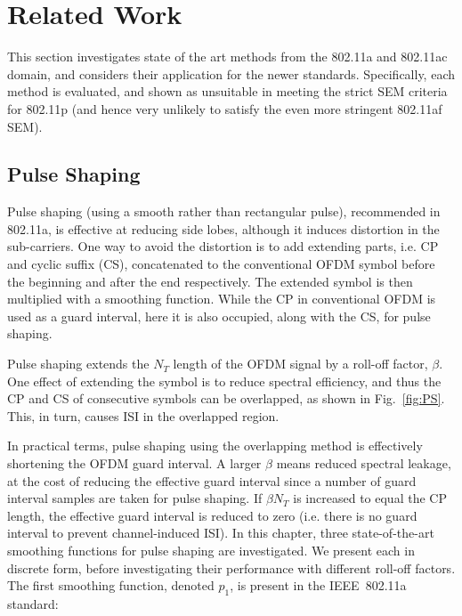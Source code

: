 \section{Related Work}

This section investigates state of the art methods from the 802.11a and 802.11ac domain, and considers their application for the newer standards.
Specifically, each method is evaluated, and shown as unsuitable in meeting the strict SEM criteria for 802.11p (and hence very unlikely to satisfy the even more stringent 802.11af SEM).

\subsection{Pulse Shaping}
\label{subsec:Pulse}
Pulse shaping (using a smooth rather than rectangular pulse), recommended in 802.11a, is effective at reducing side lobes, although it induces distortion in the sub-carriers.
One way to avoid the distortion is to add extending parts, i.e. CP and cyclic suffix (CS), concatenated to the conventional OFDM symbol before the beginning and after the end respectively. The extended symbol is then multiplied with a smoothing function.
While the CP in conventional OFDM is used as a guard interval, here it is also occupied, along with the CS, for pulse shaping.

Pulse shaping extends the  $N_{T}$ length of the OFDM signal by a roll-off factor, $\beta$.
One effect of extending the symbol is to reduce spectral efficiency, and thus the CP and CS of consecutive symbols can be overlapped, as shown in Fig.~\ref{fig:PS}. This, in turn, causes ISI in the overlapped region.

In practical terms, pulse shaping using the overlapping method is effectively shortening the OFDM guard interval.
A larger $\beta$ means reduced spectral leakage, at the cost of reducing the effective guard interval since a number of guard interval samples are taken for pulse shaping.
If $\beta N_{T}$ is increased to equal the CP length, the effective guard interval is reduced to zero (i.e. there is no guard interval to prevent channel-induced ISI).
In this chapter, three state-of-the-art smoothing functions for pulse shaping are investigated. We present each in discrete form, before investigating their performance with different roll-off factors.
The first smoothing function, denoted $p_1$, is present in the IEEE~802.11a standard:


